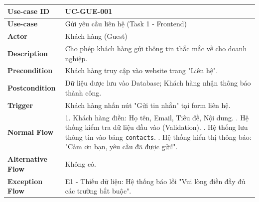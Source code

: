 \begin{table}[H]
\centering
\renewcommand{\arraystretch}{1.2}
\begin{tabular}{|p{3.5cm}|p{9.5cm}|}
\hline
\textbf{Use-case ID} & UC-GUE-001 \\ \hline
\textbf{Use-case} & Gửi yêu cầu liên hệ (Task 1 - Frontend) \\ \hline
\textbf{Actor} & Khách hàng (Guest) \\ \hline
\textbf{Description} & Cho phép khách hàng gửi thông tin thắc mắc về cho doanh nghiệp. \\ \hline
\textbf{Precondition} & Khách hàng truy cập vào website trang "Liên hệ". \\ \hline
\textbf{Postcondition} & Dữ liệu được lưu vào Database; Khách hàng nhận thông báo thành công. \\ \hline
\textbf{Trigger} & Khách hàng nhấn nút "Gửi tin nhắn" tại form liên hệ. \\ \hline
\textbf{Normal Flow} & 
1. Khách hàng điền: Họ tên, Email, Tiêu đề, Nội dung. \newline
2. Hệ thống kiểm tra dữ liệu đầu vào (Validation). \newline
3. Hệ thống lưu thông tin vào bảng \texttt{contacts}. \newline
4. Hệ thống hiển thị thông báo: "Cảm ơn bạn, yêu cầu đã được gửi!". \\ \hline
\textbf{Alternative Flow} & Không có. \\ \hline
\textbf{Exception Flow} & E1 - Thiếu dữ liệu: Hệ thống báo lỗi "Vui lòng điền đầy đủ các trường bắt buộc". \\ \hline
\end{tabular}
\end{table}

